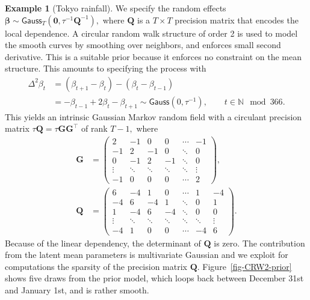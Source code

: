 \documentclass[
  11pt,
  letterpaper,
]{scrbook}
\theoremstyle{definition}
\newtheorem{example}{Example}[chapter]
\theoremstyle{plain}
\theoremstyle{plain}
\theoremstyle{plain}
\theoremstyle{definition}
\theoremstyle{definition}
\theoremstyle{plain}
\theoremstyle{plain}
\theoremstyle{remark}
\begin{document}
\begin{example}[Tokyo
rainfall]
We specify the random effects
\(\boldsymbol{\beta} \sim \mathsf{Gauss}_{T}(\boldsymbol{0}, \tau^{-1}\mathbf{Q}^{-1}),\)
where \(\mathbf{Q}\) is a \(T \times T\) precision matrix that encodes
the local dependence. A circular random walk structure of order 2 is
used to model the smooth curves by smoothing over neighbors, and
enforces small second derivative. This is a suitable prior because it
enforces no constraint on the mean structure. This amounts to specifying
the process with \begin{align*}
\Delta^2\beta_t &= (\beta_{t+1} - \beta_t) - (\beta_t - \beta_{t-1})
\\&=-\beta_{t-1} +2 \beta_t - \beta_{t+1} \sim \mathsf{Gauss}(0, \tau^{-1}), \qquad t \in \mathbb{N} \mod 366.
\end{align*} This yields an intrinsic Gaussian Markov random field with
a circulant precision matrix \(\tau\mathbf{Q}=\tau\mathbf{GG^\top}\) of
rank \(T-1,\) where \begin{align*}
\mathbf{G} &=
\begin{pmatrix}
2 & -1 & 0 & 0 & \cdots & -1\\
-1 & 2 & -1 & 0 & \ddots & 0 \\
0 & -1 & 2 & -1 & \ddots & 0 \\
\vdots & \ddots & \ddots  & \ddots  & \ddots  & \vdots \\
-1 & 0 & 0 & 0 & \cdots & 2
\end{pmatrix},
\\
\mathbf{Q} &=
\begin{pmatrix}
6 & -4 & 1 & 0 & \cdots & 1 & -4\\
-4 & 6 & -4 & 1 & \ddots & 0 & 1 \\
1 & -4 & 6 & -4 & \ddots & 0 & 0 \\
\vdots & \ddots & \ddots  & \ddots  & \ddots  & \ddots & \vdots \\
-4 & 1 & 0 & 0 & \cdots & -4 & 6
\end{pmatrix}.
\end{align*} Because of the linear dependency, the determinant of
\(\mathbf{Q}\) is zero. The contribution from the latent mean parameters
is multivariate Gaussian and we exploit for computations the sparsity of
the precision matrix \(\mathbf{Q}.\) Figure~\ref{fig-CRW2-prior} shows
five draws from the prior model, which loops back between December 31st
and January 1st, and is rather smooth.

\begin{figure}[ht!]

\centering{

}
\end{figure}
\end{example}
\end{document}

